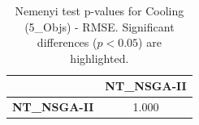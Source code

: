 \begin{table}[h!]
\centering
\scriptsize
\begin{tabular}{lc}
\toprule
 & NT\_NSGA-II \\
\midrule
\textbf{NT\_NSGA-II} & 1.000 \\
\bottomrule
\end{tabular}
\caption{Nemenyi test p-values for Cooling (5_Objs) - RMSE. Significant differences ($p < 0.05$) are highlighted.}
\label{tab:nemenyi_nemenyi_Cooling_5_Objs_Test_RMSE}
\end{table}